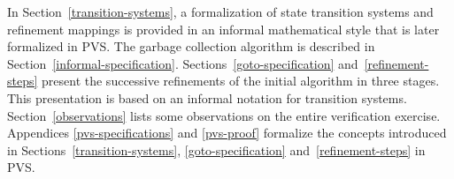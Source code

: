 In  Section~\ref{transition-systems},  a    formalization of state
transition  systems and  refinement mappings  is  provided in  an informal
mathematical style that  is  later formalized  in  PVS.  The garbage
collection algorithm is described in
Section~\ref{informal-specification}\@.
Sections~\ref{goto-specification} and~\ref{refinement-steps} present
the successive refinements of the initial algorithm in three stages.
This presentation is based on   an informal notation for  transition systems.
Section~\ref{observations} lists some observations on the entire
verification exercise. 
Appendices \ref{pvs-specifications} and \ref{pvs-proof} formalize
the concepts  introduced   in   Sections~\ref{transition-systems},
\ref{goto-specification} and~\ref{refinement-steps} in PVS.   



